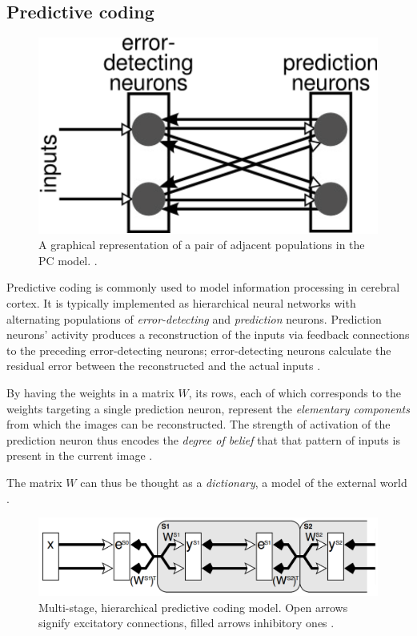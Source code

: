 \documentclass[11pt,a4paper]{report}
\begin{document}
			\subsection{Predictive coding}
				\begin{figure}[h]
					\centering
					\includegraphics[scale=0.5]{prediction}
					\caption[Representation of pair of adjacent populations in PC model.]{A graphical representation of a pair of adjacent populations in the PC model. \cite{spratling2014predictive}.}
					\label{fig:predictive}
				\end{figure}
				
				Predictive coding is commonly used to model information processing in cerebral cortex. It is typically implemented as hierarchical neural networks with alternating populations of \emph{error-detecting} and \emph{prediction} neurons. Prediction neurons' activity produces a reconstruction of the inputs via feedback connections to the preceding error-detecting neurons; error-detecting neurons calculate the residual error between the reconstructed and the actual inputs \cite{spratling2014predictive}.
				
				By having the weights in a matrix $W$, its rows, each of which corresponds to the weights targeting a single prediction neuron, represent the \emph{elementary components} from which the images can be reconstructed. The strength of activation of the prediction neuron thus encodes the \emph{degree of belief} that that pattern of inputs is present in the current image \cite{spratling2014predictive}.
				
				The matrix $W$ can thus be thought as a \emph{dictionary}, a model of the external world \cite{spratling2012unsupervised,spratling2014predictive}.

				\begin{figure}[h]
					\centering
					\includegraphics[width=\textwidth]{pc}
					\caption[Multi-stage, hierarchical predictive coding model.]{Multi-stage, hierarchical predictive coding model. Open arrows signify excitatory connections, filled arrows inhibitory ones \cite{spratling2008reconciling}.}
					\label{fig:pcbc}
				\end{figure}
\end{document}
